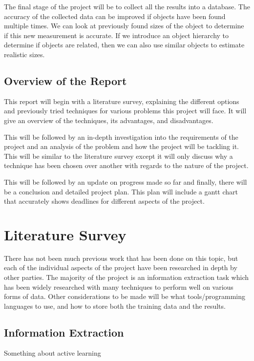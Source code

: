 \documentclass[11pt,oneside]{book}
\begin{document}
The final stage of the project will be to collect all the results into a database. The accuracy of the collected data can be improved if objects have been found multiple times. We can look at previously found sizes of the object to determine if this new measurement is accurate. If we introduce an object hierarchy to determine if objects are related, then we can also use similar objects to estimate realistic sizes.

\section{Overview of the Report}

This report will begin with a literature survey, explaining the different options and previously tried techniques for various problems this project will face. It will give an overview of the techniques, its advantages, and disadvantages.

This will be followed by an in-depth investigation into the requirements of the project and an analysis of the problem and how the project will be tackling it. This will be similar to the literature survey except it will only discuss why a technique has been chosen over another with regards to the nature of the project.

This will be followed by an update on progress made so far and finally, there will be a conclusion and detailed project plan. This plan will include a gantt chart that accurately shows deadlines for different aspects of the project.


\chapter{Literature Survey}

There has not been much previous work that has been done on this topic, but each of the individual aspects of the project have been researched in depth by other parties. The majority of the project is an information extraction task which has been widely researched with many techniques to perform well on various forms of data. Other considerations to be made will be what tools/programming languages to use, and how to store both the training data and the results.

\section{Information Extraction}
Something about active learning
\end{document}
